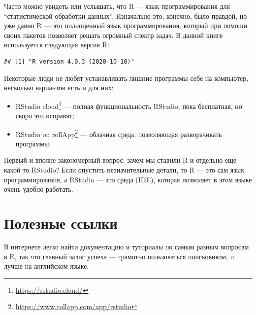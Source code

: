 \documentclass[
]{book}
\providecommand{\tightlist}{%
  \setlength{\itemsep}{0pt}\setlength{\parskip}{0pt}}
\renewcommand{\href}[2]{#2\footnote{\url{#1}}}
\begin{document}
Часто можно увидеть или услышать, что R --- язык программирования для ``статистической обработки данных''. Изначально это, конечно, было правдой, но уже давно R --- это полноценный язык программирования, который при помощи своих пакетов позволяет решать огромный спектр задач. В данной книге используется следующая версия R:

\begin{verbatim}
## [1] "R version 4.0.3 (2020-10-10)"
\end{verbatim}

Некоторые люди не любят устанавливать лишние программы себе на компьютер, несколько вариантов есть и для них:

\begin{itemize}
\tightlist
\item
  \href{https://rstudio.cloud/}{RStudio cloud} --- полная функциональность RStudio, пока бесплатная, но скоро это исправят;
\item
  \href{https://www.rollapp.com/app/rstudio}{RStudio on rollApp} --- облачная среда, позволяющая разворачивать программы.
\end{itemize}

Первый и вполне закономерный вопрос: зачем мы ставили R и отдельно еще какой-то RStudio?
Если опустить незначительные детали, то R --- это сам язык программирования, а RStudio --- это среда (IDE), которая позволяет в этом языке очень удобно работать.

\hypertarget{ux43fux43eux43bux435ux437ux43dux44bux435-ux441ux441ux44bux43bux43aux438}{%
\section{Полезные ссылки}\label{ux43fux43eux43bux435ux437ux43dux44bux435-ux441ux441ux44bux43bux43aux438}}

В интернете легко найти документацию и туториалы по самым разным вопросам в R, так что главный залог успеха --- грамотно пользоваться поисковиком, и лучше на английском языке.
\end{document}
